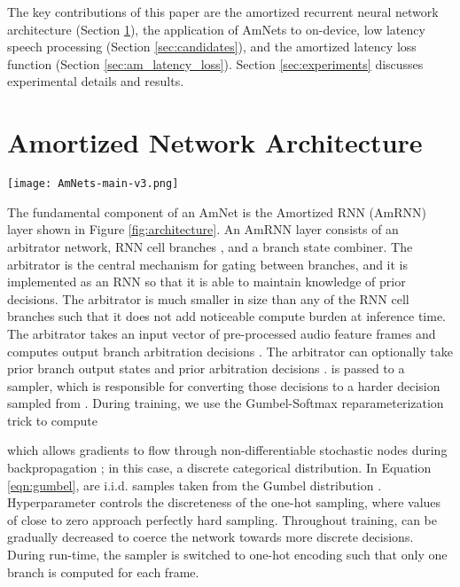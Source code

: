 \documentclass[a4paper]{article}
\begin{document}
The key contributions of this paper are the amortized recurrent neural network architecture (Section \ref{sec:amnet_architecture}), the application of AmNets to on-device, low latency speech processing (Section \ref{sec:candidates}), and the amortized latency loss function (Section \ref{sec:am_latency_loss}). Section \ref{sec:experiments} discusses experimental details and results.


\section{Amortized Network Architecture}
\label{sec:amnet_architecture}
\begin{figure*}[th!]
	\centering
\texttt{[image: AmNets-main-v3.png]}
\caption{\small Unfolded AmRNN layer with  branches. Each block represents the execution of an AmRNN layer at a single time step, i.e., a single cell. Left and center blocks illustrate branch combining during training; right block shows run-time hard branch switching.}
\label{fig:architecture}
\end{figure*}

The fundamental component of an AmNet is the Amortized RNN (AmRNN) layer shown in Figure \ref{fig:architecture}.
An AmRNN layer consists of an arbitrator network, RNN cell branches , and a branch state combiner.
The arbitrator is the central mechanism for gating between branches, and it is implemented as an RNN so that it is able to maintain knowledge of prior decisions.
The arbitrator is much smaller in size than any of the RNN cell branches such that it does not add noticeable compute burden at inference time.
The arbitrator takes an input vector of pre-processed audio feature frames  and computes output branch arbitration decisions .
The arbitrator can optionally take prior branch output states  and prior arbitration decisions .
 is passed to a sampler, which is responsible for converting those decisions to a harder decision  sampled from .
During training, we use the Gumbel-Softmax reparameterization trick to compute 
\noindent

\noindent
which allows gradients to flow through non-differentiable stochastic nodes during backpropagation \cite{Jang2017}; in this case, a discrete categorical distribution. 
In Equation \ref{eqn:gumbel},  are i.i.d. samples taken from the Gumbel distribution \cite{Gumbel1960}.
Hyperparameter  controls the discreteness of the one-hot sampling, where values of  close to zero approach perfectly hard sampling.
Throughout training,  can be gradually decreased to coerce the network towards more discrete decisions.
During run-time, the sampler is switched to one-hot encoding such that only one branch is computed for each frame. 
\end{document}
